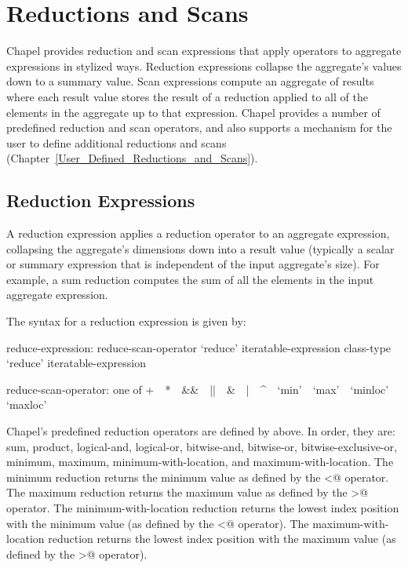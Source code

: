 \section{Reductions and Scans}
\label{Reductions_and_Scans}

Chapel provides reduction and scan expressions that apply operators to
aggregate expressions in stylized ways.  Reduction expressions
collapse the aggregate's values down to a summary value.  Scan
expressions compute an aggregate of results where each result value
stores the result of a reduction applied to all of the elements in the
aggregate up to that expression.  Chapel provides a number of predefined
reduction and scan operators, and also supports a mechanism for the
user to define additional reductions and
scans (Chapter~\ref{User_Defined_Reductions_and_Scans}).

\subsection{Reduction Expressions}
\label{reduce}

A reduction expression applies a reduction operator to an aggregate
expression, collapsing the aggregate's dimensions down into a result
value (typically a scalar or summary expression that is independent of
the input aggregate's size).  For example, a sum reduction computes
the sum of all the elements in the input aggregate expression.

The syntax for a reduction expression is given by:
\begin{syntax}
reduce-expression:
  reduce-scan-operator `reduce' iteratable-expression
  class-type `reduce' iteratable-expression

reduce-scan-operator: one of
  + $ $ $ $ * $ $ $ $ && $ $ $ $ || $ $ $ $ & $ $ $ $ | $ $ $ $ ^ $ $ $ $ `min' $ $ $ $ `max' $ $ $ $ `minloc' $ $ $ $ `maxloc'
\end{syntax}

Chapel's predefined reduction operators are defined
by  above.  In order, they are: sum,
product, logical-and, logical-or, bitwise-and, bitwise-or,
bitwise-exclusive-or, minimum, maximum, minimum-with-location, and
maximum-with-location.  The minimum reduction returns the minimum
value as defined by the \verb@<@ operator.  The maximum reduction
returns the maximum value as defined by the \verb@>@ operator.  The
minimum-with-location reduction returns the lowest index position with
the minimum value (as defined by the \verb@<@ operator).  The
maximum-with-location reduction returns the lowest index position with
the maximum value (as defined by the \verb@>@ operator).

